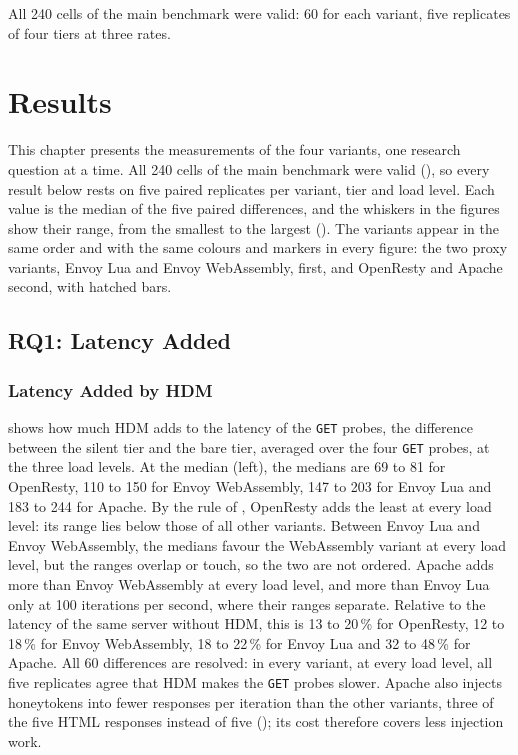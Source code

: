 \documentclass{rptuma}
\begin{document}
All 240 cells of the main benchmark were valid: 60 for each variant, five replicates of four tiers
at three rates.

\chapter{Results}
\label{chap:AB.results}

This chapter presents the measurements of the four variants, one research question at a time. All
240 cells of the main benchmark were valid (), so every result below
rests on five paired replicates per variant, tier and load level. Each value is the median of the
five paired differences, and the whiskers in the figures show their range, from the smallest to
the largest (). The variants appear in the same order and with the same
colours and markers in every figure: the two proxy variants, Envoy Lua and Envoy WebAssembly,
first, and OpenResty and Apache second, with hatched bars.

\section{RQ1: Latency Added}
\label{sec:results.rq1}

\subsection{Latency Added by HDM}
\label{sec:results.latency}

 shows how much HDM adds to the latency of the \texttt{GET} probes,
the difference between the silent tier and the bare tier, averaged over the four \texttt{GET}
probes, at the three load levels. At the median
(left), the medians are 69 to 81\us{} for OpenResty, 110 to 150\us{} for Envoy
WebAssembly, 147 to 203\us{} for Envoy Lua and 183 to 244\us{} for Apache. By the rule of
, OpenResty adds the least at every load level: its range lies
below those of all other variants. Between Envoy Lua and Envoy WebAssembly, the medians favour the
WebAssembly variant at every load level, but the ranges overlap or touch, so the two are not
ordered. Apache adds more than Envoy WebAssembly at every load level, and more than Envoy Lua only
at 100 iterations per second, where their ranges separate.
Relative to the latency of the same server without HDM, this is 13 to 20\,\% for OpenResty, 12 to 18\,\% for Envoy WebAssembly, 18 to 22\,\% for Envoy Lua and 32 to 48\,\% for
Apache. All 60 differences are resolved: in every variant, at every load level, all five
replicates agree that HDM makes the \texttt{GET} probes slower. Apache also
injects honeytokens into fewer responses per iteration than the other variants, three of the five
HTML responses instead of five (); its cost therefore covers less
injection work.
\end{document}
